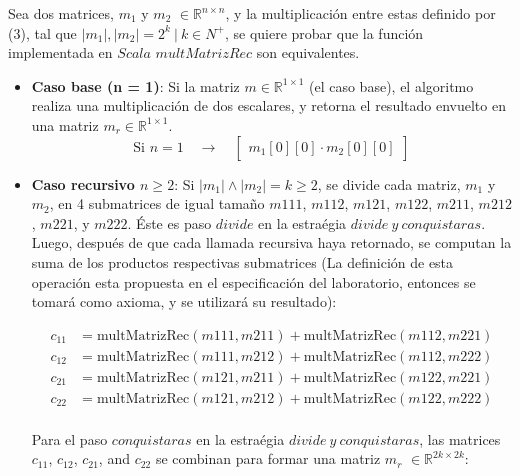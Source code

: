 \documentclass[12pt, a4paper]{article}
\begin{document}
Sea dos matrices, $m_1$ y $m_2$ $\in \mathbb{R}^{n \times n}$, y la multiplicación entre estas definido por (3), tal que $|m_1|, |m_2| = 2^k~|~ k \in N^+$, se quiere probar que 
la función implementada en $Scala$ $multMatrizRec$ son equivalentes.

\begin{itemize}
    \item \textbf{Caso base (n = 1)}: Si la matriz $m \in \mathbb{R}^{1 \times 1}$ (el caso base), el algoritmo realiza una multiplicación de dos escalares, y retorna el resultado envuelto en una matriz $m_r \in \mathbb{R}^{1 \times 1}$.
    \[
    \text{Si } n = 1 \quad \rightarrow \quad \begin{bmatrix} m_1[0][0] \cdot m_2[0][0] \end{bmatrix}
    \]

    \item \textbf{Caso recursivo $n \geq 2$}: Si $|m_1| \land |m_2| = k \geq 2$, se divide cada matriz, $m_1$ y $m_2$, en 4 submatrices de igual tamaño $m{{1{11}}}$, $m{{1{12}}}$, $m{{1{21}}}$, $m{{1{22}}}$, $m{{2{11}}}$, $m{{2{12}}}$, $m{{2{21}}}$, y $m{{2{22}}}$.
    Éste es paso $divide$ en la estraégia $divide~y~conquistaras$. \\
    Luego, después de que cada llamada recursiva haya retornado, se computan la suma de los productos respectivas submatrices (La definición de esta operación esta propuesta en el especificación del laboratorio, entonces se tomará como axioma, y se utilizará su resultado):
    
    \begin{align*}
    c_{11} &= \text{{multMatrizRec}}(m{{1{11}}}, m{{2{11}}}) + \text{{multMatrizRec}}(m{{1{12}}}, m{{2{21}}}) \\
    c_{12} &= \text{{multMatrizRec}}(m{{1{11}}}, m{{2{12}}}) + \text{{multMatrizRec}}(m{{1{12}}}, m{{2{22}}}) \\
    c_{21} &= \text{{multMatrizRec}}(m{{1{21}}}, m{{2{11}}}) + \text{{multMatrizRec}}(m{{1{22}}}, m{{2{21}}}) \\
    c_{22} &= \text{{multMatrizRec}}(m{{1{21}}}, m{{2{12}}}) + \text{{multMatrizRec}}(m{{1{22}}}, m{{2{22}}}) \\
    \end{align*}
    
    Para el paso $conquistaras$ en la estraégia $divide~y~conquistaras$, las matrices $c_{11}$, $c_{12}$, $c_{21}$, and $c_{22}$ se combinan para formar una matriz $m_r$ $\in \mathbb{R}^{2k \times 2k}$:
    

\end{itemize}
\end{document}
